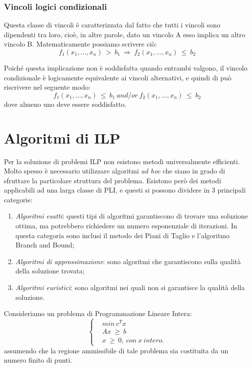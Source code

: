\subsubsection*{Vincoli logici condizionali}
Questa classe di vincoli è caratterizzata dal fatto che tutti i vincoli sono dipendenti tra loro, cioè, in altre parole, dato un vincolo A esso implica un altro vincolo B.
Matematicamente possiamo scrivere ciò:
\begin{equation}
f_1(x_1,...,x_n) ~ > ~ b_1 ~ \Longrightarrow ~ f_2(x_1,...,x_n) ~ \leq ~ b_2
\end{equation}

Poiché questa implicazione non è soddisfatta quando entrambi valgono, il vincolo condizionale è logicamente equivalente ai vincoli alternativi, e quindi di può riscrivere nel seguente modo:
\begin{equation}
f_1(x_1,...,x_n) ~ \leq ~ b_1 ~ and/or ~ f_2(x_1,...,x_n) ~ \leq ~ b_2
\end{equation}
dove almeno uno deve essere soddisfatto.


\section{Algoritmi di ILP}
Per la soluzione di problemi ILP non esistono metodi universalmente efficienti. Molto spesso è necessario utilizzare algoritmi \textit{ad hoc} che siano in grado di sfruttare la particolare struttura del problema.
Esistono però dei metodi applicabili ad una larga classe di PLI, e questi si possono dividere in 3 principali categorie:
\begin{enumerate}
\item \textit{Algoritmi esatti}: questi tipi di algoritmi garantiscono di trovare una soluzione ottima, ma potrebbero richiedere un numero esponenziale di iterazioni. In questa categoria sono inclusi il metodo dei Piani di Taglio e l'algoritmo Branch and Bound;
\item \textit{Algoritmi di approssimazione}: sono algoritmi che garantiscono sulla qualità della soluzione trovata;
\item \textit{Algoritmi euristici}: sono algoritmi nei quali non si garantisce la qualità della soluzione.
\end{enumerate} 

Consideriamo un problema di Programmazione Lineare Intera:
\begin{equation}
\label{eq:progLinInt}
\begin{cases}
& min ~ c^T x \\
& Ax ~ \geq ~ b \\
& x ~ \geq ~ 0, ~ con ~ x ~ intero.
\end{cases}
\end{equation}
assumendo che la regione ammissibile di tale problema sia costituita da un numero finito di punti.

